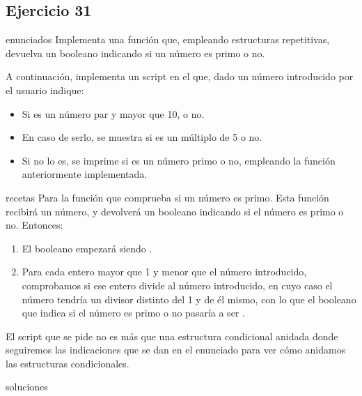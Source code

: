 \subsection{Ejercicio 31}
\def\parte{enunciados}
\ifx\capitulo\parte
Implementa una función  que, empleando estructuras repetitivas, devuelva un booleano indicando si un número es primo o no.

A continuación, implementa un script en el que, dado un número introducido por el usuario indique:
\begin{itemize}
\item Si es un número par y mayor que 10, o no.
\item En caso de serlo, se muestra si es un múltiplo de 5 o no.
\item Si no lo es, se imprime si es un número primo o no, empleando la función anteriormente implementada.
\end{itemize}
\fi

\def\parte{recetas}
\ifx\capitulo\parte
Para la función que comprueba si un número es primo. Esta función recibirá un número, y devolverá un booleano indicando si el número es primo o no. Entonces:

\begin{enumerate}
\item El booleano empezará siendo .
\item Para cada entero mayor que 1 y menor que el número introducido, comprobamos si ese entero divide al número introducido, en cuyo caso el número tendría un divisor distinto del 1 y de él mismo, con lo que el booleano que indica si el número es primo o no pasaría a ser .
\end{enumerate}

El script que se pide no es más que una estructura condicional anidada donde seguiremos las indicaciones que se dan en el enunciado para ver cómo anidamos las estructuras condicionales.
\fi

\def\parte{soluciones}
\ifx\capitulo\parte


\fi

